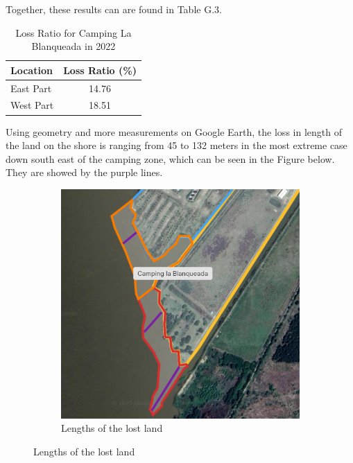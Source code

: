 Together, these results can are found in Table G.3.

\begin{table}[h]
\centering
\caption{Loss Ratio for Camping La Blanqueada in 2022}
\label{tab:LossRatio}
\begin{tabular}{l c}
\toprule
\textbf{Location} & \textbf{Loss Ratio (\%)} \\
\midrule
East Part & 14.76 \\
West Part & 18.51 \\
\bottomrule
\end{tabular}
\end{table}

Using geometry and more measurements on Google Earth, the loss in length of the land on the shore is ranging from 45 to 132 meters in the most extreme case down south east of the camping zone, which can be seen in the Figure below. They are showed by the purple lines.

\begin{figure}[H]
    \centering
    \begin{subfigure}[b]{0.48\textwidth}
        \includegraphics[width=\linewidth, height =6
        cm]{figures/appendix-g/length.png}
        \caption{Lengths of the lost land}
        \label{fig:second}
    \end{subfigure}
\end{figure}
